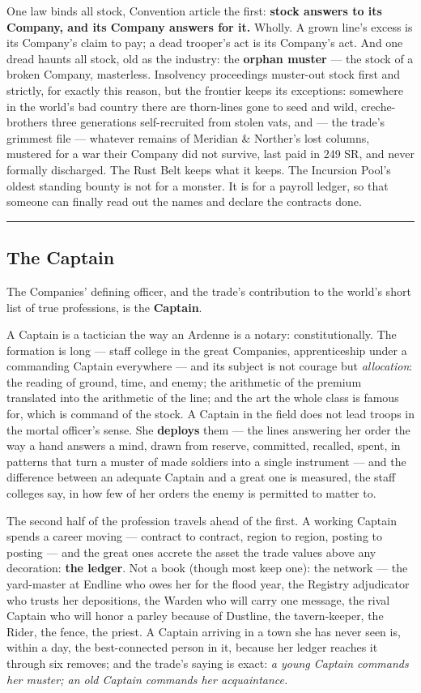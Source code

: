 One law binds all stock, Convention article the first: \textbf{stock answers to its Company, and its Company answers for it.} Wholly. A grown line's excess is its Company's claim to pay; a dead trooper's act is its Company's act. And one dread haunts all stock, old as the industry: the \textbf{orphan muster} --- the stock of a broken Company, masterless. Insolvency proceedings muster-out stock first and strictly, for exactly this reason, but the frontier keeps its exceptions: somewhere in the world's bad country there are thorn-lines gone to seed and wild, creche-brothers three generations self-recruited from stolen vats, and --- the trade's grimmest file --- whatever remains of Meridian \& Norther's lost columns, mustered for a war their Company did not survive, last paid in 249 SR, and never formally discharged. The Rust Belt keeps what it keeps. The Incursion Pool's oldest standing bounty is not for a monster. It is for a payroll ledger, so that someone can finally read out the names and declare the contracts done.

\medskip\hrule\medskip

\subsection{The Captain}

The Companies' defining officer, and the trade's contribution to the world's short list of true professions, is the \textbf{Captain}.

A Captain is a tactician the way an Ardenne is a notary: constitutionally. The formation is long --- staff college in the great Companies, apprenticeship under a commanding Captain everywhere --- and its subject is not courage but \textit{allocation}: the reading of ground, time, and enemy; the arithmetic of the premium translated into the arithmetic of the line; and the art the whole class is famous for, which is command of the stock. A Captain in the field does not lead troops in the mortal officer's sense. She \textbf{deploys} them --- the lines answering her order the way a hand answers a mind, drawn from reserve, committed, recalled, spent, in patterns that turn a muster of made soldiers into a single instrument --- and the difference between an adequate Captain and a great one is measured, the staff colleges say, in how few of her orders the enemy is permitted to matter to.

The second half of the profession travels ahead of the first. A working Captain spends a career moving --- contract to contract, region to region, posting to posting --- and the great ones accrete the asset the trade values above any decoration: \textbf{the ledger}. Not a book (though most keep one): the network --- the yard-master at Endline who owes her for the flood year, the Registry adjudicator who trusts her depositions, the Warden who will carry one message, the rival Captain who will honor a parley because of Dustline, the tavern-keeper, the Rider, the fence, the priest. A Captain arriving in a town she has never seen is, within a day, the best-connected person in it, because her ledger reaches it through six removes; and the trade's saying is exact: \textit{a young Captain commands her muster; an old Captain commands her acquaintance.}

